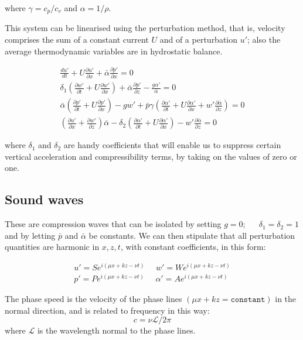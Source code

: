 where $\gamma = c_p/c_v$ and $\alpha = 1/\rho$.

This system can be linearised using the perturbation method, that is, velocity comprises the sum of a constant current $U$ and of a perturbation $u'$; also the average thermodynamic variables are in hydrostatic balance.

\begin{eqnarray}
	\frac{d u'}{dt} + U \frac{\partial u'}{\partial x} + \bar{\alpha} \frac{\partial p'}{\partial x} = 0\\
	\delta_1 (\frac{\partial w'}{\partial t} + U \frac{\partial w'}{\partial x} ) + \bar{\alpha} \frac{\partial p'}{\partial z}  - \frac{g \alpha'}{\bar{\alpha}} =0 \nonumber\\
	\bar{\alpha}  (\frac{\partial p'}{\partial t} + U \frac{\partial p'}{\partial x} ) -g w'  +\bar{p}\gamma  ( \frac{\partial \alpha'}{\partial t} + U  \frac{\partial \alpha'}{\partial x} + w'  \frac{\partial \bar{\alpha}}{\partial z}) = 0 \nonumber \\
    (\frac{\partial u'}{\partial x} + \frac{\partial w'}{\partial z} ) \bar{\alpha} - \delta_2  ( \frac{\partial \alpha'}{\partial t} + U  \frac{\partial \alpha'}{\partial x}) - w'  \frac{\partial \bar{\alpha}}{\partial z}  = 0  \nonumber
\label{primitive_linear}
\end{eqnarray}

where $\delta_1$ and $\delta_2$ are handy coefficients that will enable us to suppress certain vertical acceleration and compressibility terms, by taking on the values of zero or one.

\subsection{Sound waves}

These are compression waves that can be isolated by setting $g=0$; ~~ $\delta_1=\delta_2=1$ and by letting $\bar{p}$ and $\bar{\alpha}$ be constants. 
We can then stipulate that all perturbation quantities are harmonic in $x,z,t$, with constant coefficients, in this form:

\begin{eqnarray}
u'=Se^{i (\mu x+kz-\nu t)}  ~~~~~~ w'=We^{i (\mu x+kz-\nu t ) }  \\
p'=Pe^{i (\mu x+kz-\nu t)}  ~~~~~~ \alpha'=Ae^{i (\mu x+kz-\nu t ) } \nonumber  
\end{eqnarray}

\begin{definition}
	The phase speed is the velocity of the phase lines $(\mu x+kz = \mathtt{constant})$ in the normal direction, and is related to frequency in this way:
	\begin{equation}
		c = \nu \mathcal{L} / 2 \pi
	\end{equation}
	where $\mathcal{L} $ is the wavelength normal to the phase lines. 
\end{definition}

